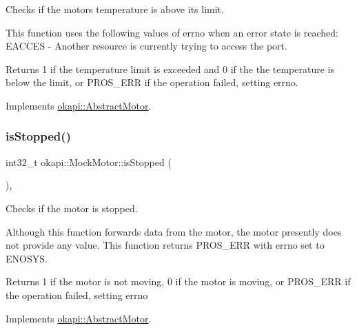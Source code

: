 Checks if the motor\textquotesingle{}s temperature is above its limit. 

This function uses the following values of errno when an error state is reached\+: E\+A\+C\+C\+ES -\/ Another resource is currently trying to access the port.

\begin{DoxyReturn}{Returns}
1 if the temperature limit is exceeded and 0 if the the temperature is below the limit, or P\+R\+O\+S\+\_\+\+E\+RR if the operation failed, setting errno. 
\end{DoxyReturn}


Implements \mbox{\hyperlink{classokapi_1_1AbstractMotor_a61e24db43d1fe790b173cc0b4e27922f}{okapi\+::\+Abstract\+Motor}}.

\mbox{\label{classokapi_1_1MockMotor_a169f019d8567baf80ec75c43c95edbd8}} 
\subsubsection{\texorpdfstring{isStopped()}{isStopped()}}
{\footnotesize\ttfamily int32\+\_\+t okapi\+::\+Mock\+Motor\+::is\+Stopped (\begin{DoxyParamCaption}{ }\end{DoxyParamCaption})\hspace{0.3cm}{\ttfamily [override]}, {\ttfamily [virtual]}}



Checks if the motor is stopped. 

Although this function forwards data from the motor, the motor presently does not provide any value. This function returns P\+R\+O\+S\+\_\+\+E\+RR with errno set to E\+N\+O\+S\+YS.

\begin{DoxyReturn}{Returns}
1 if the motor is not moving, 0 if the motor is moving, or P\+R\+O\+S\+\_\+\+E\+RR if the operation failed, setting errno 
\end{DoxyReturn}


Implements \mbox{\hyperlink{classokapi_1_1AbstractMotor_aa46c96a6eec7921ad5b12fcd4119358e}{okapi\+::\+Abstract\+Motor}}.

\mbox{\label{classokapi_1_1MockMotor_a0f933850a2584d908e0b0da297836f81}} 
